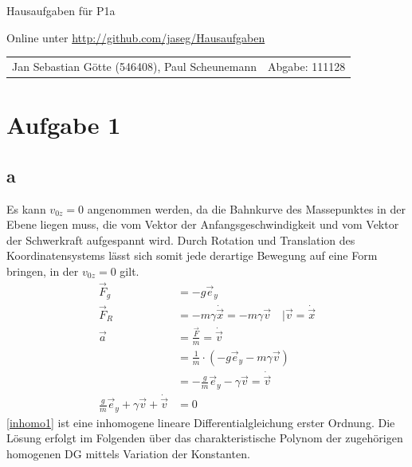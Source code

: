 \documentclass[12pt,a4paper,notitlepage]{article}
\newcommand{\aufgabe}[1]{\section*{\setcounter{section}{#1}Aufgabe #1}}
\begin{document}
\begin{center}
\Large Hausaufgaben für P1a

\normalsize Online unter \url{http://github.com/jaseg/Hausaufgaben}
\end{center}
\begin{tabularx}{\textwidth}{Xr}
Jan Sebastian Götte (546408), Paul Scheunemann&Abgabe: 111128
\end{tabularx}
\aufgabe{1}
\subsection*{a}
Es kann $v_{0z}=0$ angenommen werden, da die Bahnkurve des Massepunktes in der Ebene liegen muss, die vom Vektor der Anfangsgeschwindigkeit und vom Vektor der Schwerkraft aufgespannt wird. Durch Rotation und Translation des Koordinatensystems lässt sich somit jede derartige Bewegung auf eine Form bringen, in der $v_{0z}=0$ gilt.
\begin{align}
\vec F_g&=-g\vec e_y\\
\vec F_R&=-m\gamma\dot{\vec x}=-m\gamma\vec v\quad\Big|\vec v=\dot{\vec x}\\
\vec a&=\frac{\vec F}{m}=\dot{\vec v}\\
&=\frac{1}{m}\cdot\left(-g\vec e_y-m\gamma\vec v\right)\\
&=-\frac{g}{m}\vec e_y-\gamma\vec v=\dot{\vec v}\\
\frac{g}{m}\vec e_y+\gamma\vec v+\dot{\vec v}&=0\label{inhomo1}
\end{align}
\ref{inhomo1} ist eine inhomogene lineare Differentialgleichung erster Ordnung. Die Lösung erfolgt im Folgenden über das charakteristische Polynom der zugehörigen homogenen DG mittels Variation der Konstanten.
\end{document}
